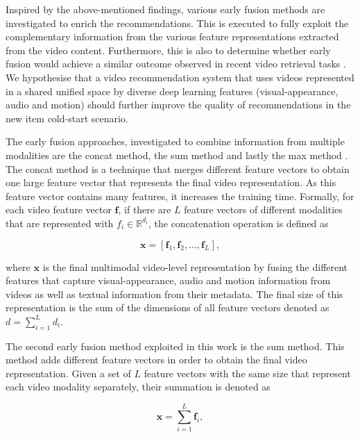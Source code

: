 \documentclass[review]{elsarticle}
\begin{document}
Inspired by the above-mentioned findings, various early fusion methods are investigated to enrich the recommendations. This is executed to fully exploit the complementary information from the various feature representations extracted from the video content. Furthermore, this is also to determine whether early fusion would achieve a similar outcome observed in recent video retrieval tasks \citep{liu2019use,miech2019howto100m}. We hypothesise that a video recommendation system that uses videos represented in a shared unified space by diverse deep learning features (visual-appearance, audio and motion) should further improve the quality of recommendations in the new item cold-start scenario. 

The early fusion approaches, investigated to combine information from multiple modalities are the \ac{concat} method, the \ac{sum} method and lastly the \ac{max} method \citep{kalliatakis2019exploring}. The concat method is a technique that merges different feature vectors to obtain one large feature vector that represents the final video representation. As this feature vector contains many features, it increases the training time. Formally, for each video feature vector $\mathbf{f}$, if there are $L$ feature vectors of different modalities that are represented with $f_i \in \mathbb{R}^{d_i}$, the concatenation operation is defined as



\begin{equation}
    \mathbf{x} = [\mathbf{f}_1, \mathbf{f}_2, \dots, \mathbf{f}_L],
\end{equation}

\noindent where $\mathbf{x}$ is the final multimodal video-level representation by fusing the different features that capture visual-appearance, audio and motion information from videos as well as textual information from their metadata. The final size of this representation is the sum of the dimensions of all feature vectors denoted as $d = \sum_{i=1}^{L}d_i$.

The second early fusion method exploited in this work is the sum method. This method adds different feature vectors in order to obtain the final video representation. Given a set of $L$ feature vectors with the same size that represent each video modality separately, their summation is denoted as

\begin{equation}
    \mathbf{x} = \sum_{i=1}^{L} \mathbf{f}_i,
    \label{eq:sum_fusion}
\end{equation}
\end{document}
